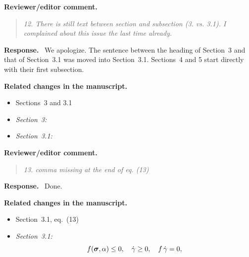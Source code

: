 \documentclass[pdflatex,sn-mathphys-num]{sn-jnl}
\newcommand{\changed}[1]{\begingroup\color{blue}#1\endgroup}
\newenvironment{reviewercomment}
  {\par\noindent\textbf{Reviewer/editor comment.}\begin{quote}\itshape}
  {\end{quote}}
\newenvironment{response}
  {\par\noindent\textbf{Response.}\ }
  {\par}
\newenvironment{relatedchanges}
  {\par\noindent\textbf{Related changes in the manuscript.}\begin{itemize}\small}
  {\end{itemize}}
\newcommand{\msloc}[1]{\textit{#1:}\ }
\newcommand{\relhead}[1]{\item[]\vspace*{0.2\baselineskip}#1}
\begin{document}
\begin{reviewercomment}
12. There is still text between section and subsection (3. vs. 3.1). I complained about this issue the last time already.
\end{reviewercomment}
\begin{response}
We apologize. The sentence between the heading of Section~3 and that of Section~3.1 was moved into Section~3.1. Sections~4 and 5 start directly with their first subsection.
\end{response}
\begin{relatedchanges}
\relhead{Sections~3 and 3.1}
\item \msloc{Section~3}
\item \msloc{Section~3.1}
\end{relatedchanges}

\begin{reviewercomment}
13. comma missing at the end of eq. (13)
\end{reviewercomment}
\begin{response}
Done.
\end{response}
\begin{relatedchanges}
\relhead{Section~3.1, eq.~(13)}
\item \msloc{Section~3.1}
\begin{equation*}
    f(\boldsymbol{\sigma},\alpha) \le 0, 
    \quad \dot{\gamma} \ge 0, 
    \quad f\,\dot{\gamma} = 0\changed{,}
\end{equation*}
\end{relatedchanges}
\end{document}
